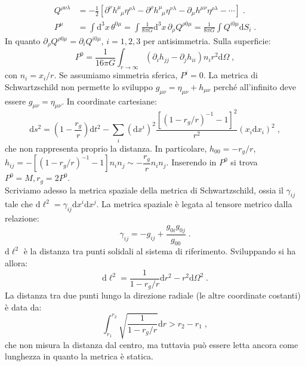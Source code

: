 \documentclass[12pt,a4paper]{report}
\theoremstyle{definition}
\newcommand{\diff}[1][]{\mathrm{d}#1}
\begin{document}
\begin{align*}
Q^{\rho\nu\lambda} &=-\frac{1}{2}\left[\partial^{\nu}h^{\mu}_{\;\;\mu}\eta^{\rho\lambda}-\partial^{\rho}h^{\mu}_{\;\;\mu}\eta^{\nu\lambda}-\partial_{\mu}h^{\mu\nu}\eta^{\rho\lambda}-\cdots\right]\;. \\
P^{\mu} &=\int \diff^3{x}\,\theta^{0\mu}=\int\frac{1}{8\pi G}\diff^3{x}\,\partial_{\rho}Q^{\rho 0\mu}=\frac{1}{8\pi G}\int Q^{i 0\mu}\diff{S_i}\;.
\end{align*}
In quanto $\partial_{\rho}Q^{\rho 0\mu}=\partial_iQ^{i0\mu}$, $i=1,2,3$ per antisimmetria. Sulla superficie:
\begin{equation}
P^0=\frac{1}{16\pi G}\int_{r\to\infty} (\partial_ih_{jj}-\partial_jh_{ii})n_ir^2\diff{\Omega}\;,
\end{equation}
con $n_i=x_i/r$. Se assumiamo simmetria sferica, $P^i=0$. La metrica di Schwartzschild non permette lo sviluppo $g_{\mu\nu}=\eta_{\mu\nu}+h_{\mu\nu}$ perché all'infinito deve essere $g_{\mu\nu}=\eta_{\mu\nu}$. In coordinate cartesiane:
\begin{equation}
\diff{s}^2=\left(1-\frac{r_g}{r}\right)\diff{t}^2-\sum_i (\diff{x^i})^2\frac{[(1-r_g/r)^{-1}-1]^2}{r^2}(x_i\diff{x_i})^2\;,
\end{equation}
che non rappresenta proprio la distanza. In particolare, $h_{00}=-r_g/r$, $h_{ij}=-[(1-r_g/r)^{-1}-1]n_in_j\sim -\dfrac{r_g}{r}n_in_j$. Inserendo in $P^0$ si trova $P^0=M, r_g=2P^0$.\\
Scriviamo adesso la metrica spaziale della metrica di Schwartzschild, ossia il $\gamma_{ij}$ tale che $\diff{\ell}^2=\gamma_{ij}\diff{x^i}\diff{x^j}$. La metrica spaziale è legata al tensore metrico dalla relazione:
$$
\gamma_{ij}=-g_{ij}+\frac{g_{0i}g_{0j}}{g_{00}}\;.
$$
$\diff{\ell}^2$ è la distanza tra punti solidali al sistema di riferimento. Sviluppando si ha allora:
\begin{equation}
\diff{\ell}^2=\frac{1}{1-r_g/r}\diff{r}^2-r^2\diff{\Omega}^2\;.
\end{equation}
La distanza tra due punti lungo la direzione radiale (le altre coordinate costanti) è data da:
$$
\int_{r_1}^{r_2}\sqrt{\frac{1}{1-r_g/r}}\diff{r}>r_2-r_1\;,
$$
che non misura la distanza dal centro, ma tuttavia può essere letta ancora come lunghezza in quanto la metrica è statica.
\end{document}
